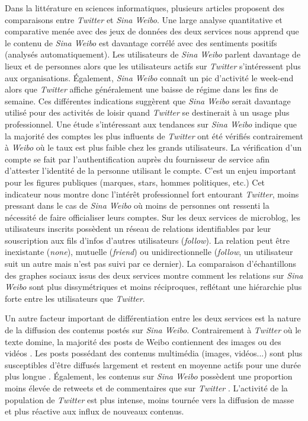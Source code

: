 Dans la littérature en sciences informatiques, plusieurs articles proposent des comparaisons entre \textit{Twitter} et \textit{Sina Weibo}. Une large analyse quantitative et comparative menée avec des jeux de données des deux services \citep{Gao2012} nous apprend que le contenu de \textit{Sina Weibo} est davantage corrélé avec des sentiments positifs (analysés automatiquement). Les utilisateurs de \textit{Sina Weibo} parlent davantage de lieux et de personnes alors que les utilisateurs actifs sur \textit{Twitter} s’intéressent plus aux organisations. Également, \textit{Sina Weibo} connaît un pic d’activité le week-end alors que \textit{Twitter} affiche généralement une baisse de régime dans les fins de semaine. Ces différentes indications suggèrent que \textit{Sina Weibo} serait davantage utilisé pour des activités de loisir quand \textit{Twitter} se destinerait à un usage plus professionnel. Une étude s’intéressant aux tendances sur \textit{Sina Weibo} \citep{Yu2011} indique que la majorité des comptes les plus influents de \textit{Twitter} ont été vérifiés contrairement à \textit{Weibo} où le taux est plus faible chez les grands utilisateurs. La vérification d’un compte se fait par l’authentification auprès du fournisseur de service afin d’attester l'identité de la personne utilisant le compte. C’est un enjeu important pour les figures publiques (marques, stars, hommes politiques, etc.) Cet indicateur nous montre donc l’intérêt professionnel fort entourant \textit{Twitter}, moins pressant dans le cas de \textit{Sina Weibo} où moins de personnes ont ressenti la nécessité de faire officialiser leurs comptes. Sur les deux services de microblog, les utilisateurs inscrits possèdent un réseau de relations identifiables par leur souscription aux fils d’infos d’autres utilisateurs (\textit{follow}). La relation peut être inexistante (\textit{none}), mutuelle (\textit{friend}) ou unidirectionnelle (\textit{follow}, un utilisateur suit un autre mais n’est pas suivi par ce dernier). La comparaison d’échantillons des graphes sociaux issus des deux services \citep{Chen2012} montre comment les relations sur \textit{Sina Weibo} sont plus dissymétriques et moins réciproques, reflétant une hiérarchie plus forte entre les utilisateurs que \textit{Twitter}. 

Un autre facteur important de différentiation entre les deux services est la nature de la diffusion des contenus postés sur \textit{Sina Weibo}. Contrairement à \textit{Twitter} où le texte domine, la majorité des posts de Weibo contiennent des images ou des vidéos \citep{Zhao2012}. Les posts possédant des contenus multimédia (images, vidéos...) sont plus susceptibles d’être diffusés largement et restent en moyenne actifs pour une durée plus longue \citep{Zhao2012}. Également, les contenus sur \textit{Sina Weibo} possèdent une proportion moins élevée de retweets et de commentaires que sur \textit{Twitter} \citep{Zhao2012, Gao2012}. L’activité de la population de \textit{Twitter} est plus intense, moins tournée vers la diffusion de masse et plus réactive aux influx de nouveaux contenus. 

